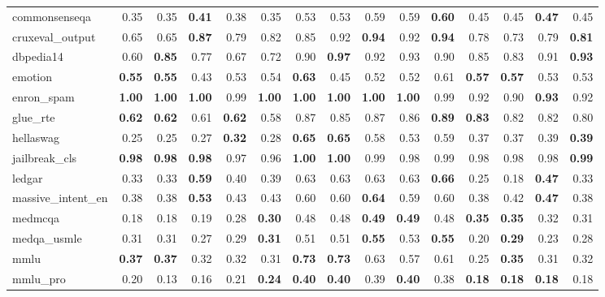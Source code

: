 \begin{table}[tbp]
{\begin{tabular}{lrrrrrrrrrrrrrr}
commonsenseqa & 0.35 & 0.35 & \textbf{0.41} & 0.38 & 0.35 & 0.53 & 0.53 & 0.59 & 0.59 & \textbf{0.60} & 0.45 & 0.45 & \textbf{0.47} & 0.45 \\
cruxeval\_output & 0.65 & 0.65 & \textbf{0.87} & 0.79 & 0.82 & 0.85 & 0.92 & \textbf{0.94} & 0.92 & \textbf{0.94} & 0.78 & 0.73 & 0.79 & \textbf{0.81} \\
dbpedia14 & 0.60 & \textbf{0.85} & 0.77 & 0.67 & 0.72 & 0.90 & \textbf{0.97} & 0.92 & 0.93 & 0.90 & 0.85 & 0.83 & 0.91 & \textbf{0.93} \\
emotion & \textbf{0.55} & \textbf{0.55} & 0.43 & 0.53 & 0.54 & \textbf{0.63} & 0.45 & 0.52 & 0.52 & 0.61 & \textbf{0.57} & \textbf{0.57} & 0.53 & 0.53 \\
enron\_spam & \textbf{1.00} & \textbf{1.00} & \textbf{1.00} & 0.99 & \textbf{1.00} & \textbf{1.00} & \textbf{1.00} & \textbf{1.00} & \textbf{1.00} & 0.99 & 0.92 & 0.90 & \textbf{0.93} & 0.92 \\
glue\_rte & \textbf{0.62} & \textbf{0.62} & 0.61 & \textbf{0.62} & 0.58 & 0.87 & 0.85 & 0.87 & 0.86 & \textbf{0.89} & \textbf{0.83} & 0.82 & 0.82 & 0.80 \\
hellaswag & 0.25 & 0.25 & 0.27 & \textbf{0.32} & 0.28 & \textbf{0.65} & \textbf{0.65} & 0.58 & 0.53 & 0.59 & 0.37 & 0.37 & 0.39 & \textbf{0.39} \\
jailbreak\_cls & \textbf{0.98} & \textbf{0.98} & \textbf{0.98} & 0.97 & 0.96 & \textbf{1.00} & \textbf{1.00} & 0.99 & 0.98 & 0.99 & 0.98 & 0.98 & 0.98 & \textbf{0.99} \\
ledgar & 0.33 & 0.33 & \textbf{0.59} & 0.40 & 0.39 & 0.63 & 0.63 & 0.63 & 0.63 & \textbf{0.66} & 0.25 & 0.18 & \textbf{0.47} & 0.33 \\
massive\_intent\_en & 0.38 & 0.38 & \textbf{0.53} & 0.43 & 0.43 & 0.60 & 0.60 & \textbf{0.64} & 0.59 & 0.60 & 0.38 & 0.42 & \textbf{0.47} & 0.38 \\
medmcqa & 0.18 & 0.18 & 0.19 & 0.28 & \textbf{0.30} & 0.48 & 0.48 & \textbf{0.49} & \textbf{0.49} & 0.48 & \textbf{0.35} & \textbf{0.35} & 0.32 & 0.31 \\
medqa\_usmle & 0.31 & 0.31 & 0.27 & 0.29 & \textbf{0.31} & 0.51 & 0.51 & \textbf{0.55} & 0.53 & \textbf{0.55} & 0.20 & \textbf{0.29} & 0.23 & 0.28 \\
mmlu & \textbf{0.37} & \textbf{0.37} & 0.32 & 0.32 & 0.31 & \textbf{0.73} & \textbf{0.73} & 0.63 & 0.57 & 0.61 & 0.25 & \textbf{0.35} & 0.31 & 0.32 \\
mmlu\_pro & 0.20 & 0.13 & 0.16 & 0.21 & \textbf{0.24} & \textbf{0.40} & \textbf{0.40} & 0.39 & \textbf{0.40} & 0.38 & \textbf{0.18} & \textbf{0.18} & \textbf{0.18} & 0.18 \\

\end{tabular}}
\end{table}
